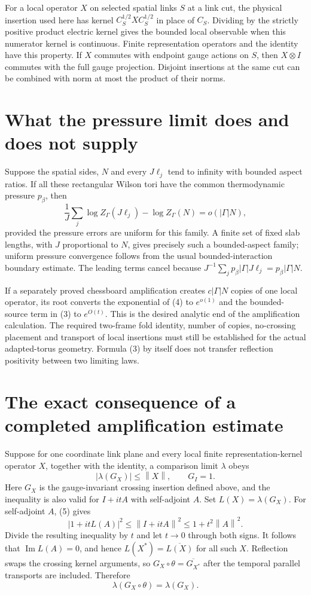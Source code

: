 \documentclass[11pt]{article}
\newcommand{\norm}[1]{\left\|#1\right\|}
\begin{document}
For a local operator $X$ on selected spatial links $S$ at a link cut,
the physical insertion used here has kernel
$C_S^{1/2}XC_S^{1/2}$ in place of $C_S$. Dividing by the strictly
positive product electric kernel gives the bounded local observable
when this numerator kernel is continuous. Finite representation
operators and the identity have this property.
If $X$ commutes with endpoint gauge actions on $S$, then $X\otimes I$
commutes with the full gauge projection. Disjoint insertions at the
same cut can be combined with norm at most the product of their norms.

\section{What the pressure limit does and does not supply}

Suppose the spatial sides, $N$ and every $J\ell_j$ tend to infinity
with bounded aspect ratios. If all these rectangular Wilson tori have
the common thermodynamic pressure $p_\beta$, then
\[
 \frac1J\sum_j\log Z_\Gamma(J\ell_j)-\log Z_\Gamma(N)
 =o(|\Gamma|N),
 \tag{4}
\]
provided the pressure errors are uniform for this family. A finite set
of fixed slab lengths, with $J$ proportional to $N$, gives precisely
such a bounded-aspect family; uniform pressure convergence follows
from the usual bounded-interaction boundary estimate.
The leading terms cancel because
$J^{-1}\sum_j p_\beta|\Gamma|J\ell_j=p_\beta|\Gamma|N$.

If a separately proved chessboard amplification creates $c|\Gamma|N$
copies of one local operator, its root converts the exponential of
(4) to $e^{o(1)}$ and the bounded-source term in (3) to $e^{O(t)}$.
This is the desired analytic end of the amplification calculation.
The required two-frame fold identity, number of copies, no-crossing
placement and transport of local insertions must still be established
for the actual adapted-torus geometry. Formula (3) by itself does not
transfer reflection positivity between two limiting laws.

\section{The exact consequence of a completed amplification estimate}

Suppose for one coordinate link plane and every local finite
representation-kernel operator $X$, together with the identity, a
comparison limit $\lambda$ obeys
\[
 |\lambda(G_X)|\leq\norm X,\qquad G_I=1.
 \tag{5}
\]
Here $G_X$ is the gauge-invariant crossing insertion defined above,
and the inequality is also valid for $I+itA$ with self-adjoint $A$.
Set $L(X)=\lambda(G_X)$. For self-adjoint $A$, (5) gives
\[
 |1+itL(A)|^2\leq\norm{I+itA}^2
                  \leq1+t^2\norm A^2.
\]
Divide the resulting inequality by $t$ and let $t\to0$ through both
signs. It follows that $\operatorname{Im}L(A)=0$, and hence
$L(X^*)=\overline{L(X)}$ for all such $X$.
Reflection swaps the crossing kernel arguments, so
$G_X\circ\theta=\overline{G_{X^*}}$ after the temporal parallel
transports are included. Therefore
\[
 \lambda(G_X\circ\theta)=\lambda(G_X).
 \tag{6}
\]
\end{document}
